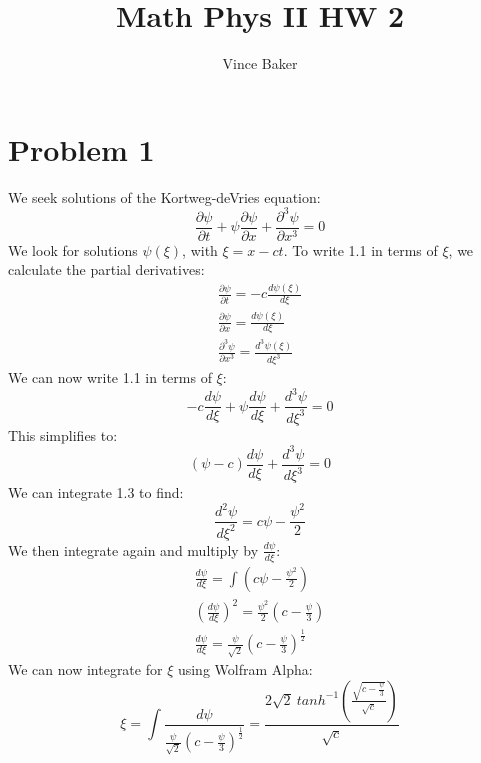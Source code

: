 \documentclass[a4paper,10pt]{article}
\title{Math Phys II HW 2}
\author{Vince Baker}
\numberwithin{equation}{section}
\begin{document}
\maketitle

\begin{abstract}

\end{abstract}

\section{Problem 1}
We seek solutions of the Kortweg-deVries equation:
\begin{equation}
 \frac{\partial \psi}{\partial t}+\psi\frac{\partial \psi}{\partial x}+\frac{\partial ^3 \psi}{\partial x^3}=0
\end{equation}
We look for solutions $\psi(\xi)$, with $\xi=x-ct$. To write 1.1 in terms of $\xi$, we calculate the partial derivatives:
\begin{gather*}
 \frac{\partial \psi}{\partial t}=-c\frac{d \psi(\xi)}{d \xi}\\
 \frac{\partial \psi}{\partial x}=\frac{d \psi(\xi)}{d \xi}\\
 \frac{\partial^3 \psi}{\partial x^3}=\frac{d^3 \psi(\xi)}{d \xi ^3}
\end{gather*}
We can now write 1.1 in terms of $\xi$:
\begin{equation} 
-c\frac{d \psi}{d \xi}+\psi\frac{d \psi}{d \xi}+\frac{d^3 \psi}{d \xi ^3}=0
\end{equation}
This simplifies to:
\begin{equation}
 (\psi-c)\frac{d \psi}{d \xi}+\frac{d^3 \psi}{d \xi ^3}=0
\end{equation}
We can integrate 1.3 to find:
\begin{equation}
 \frac{d^2\psi}{d\xi^2}=c\psi-\frac{\psi^2}{2}
\end{equation}
We then integrate again and multiply by $\frac{d \psi}{d \xi}$:
\begin{gather}
\frac{d\psi}{d\xi}=\int(c\psi-\frac{\psi^2}{2})\\
(\frac{d\psi}{d\xi})^2=\frac{\psi^2}{2}(c-\frac{\psi}{3})\\
\frac{d\psi}{d\xi}=\frac{\psi}{\sqrt{2}}(c-\frac{\psi}{3})^\frac{1}{2}
\end{gather}
We can now integrate for $\xi$ using Wolfram Alpha:
\begin{equation}
 \xi =\int \frac{d \psi}{\frac{\psi}{\sqrt{2}}(c-\frac{\psi}{3})^{\frac{1}{2}}}
 =\frac{2\sqrt{2}\ tanh^{-1}(\frac{\sqrt{c-\frac{\psi}{3}}}{\sqrt{c}})}{\sqrt{c}}
\end{equation}
\end{document}
